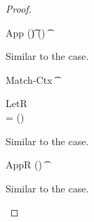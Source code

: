 \documentclass[acmsmall,screen,nonacm%
\Anonymous{,anonymous}{}%
\Final{}{,review}%
]{acmart}
\providecommand{\DIFaddbegin}{} %
\providecommand{\DIFaddend}{} %
\begin{document}
\begin{theorem}[Canonicalization]
\begin{proof}
\begin{proofcases}
\begin{proofcases}
		\begin{llproof}
\Hand 		  {}
		\end{llproof}
	  \end{proofcases}

      \proofcasederivation
	{App}
	{\semenv(\t) \in \semenv(\x)}
	{\semenv \th \capp \x \t}

      \begin{llproof}
	Similar to the  case.
      \end{llproof}


      \DIFaddbegin \proofcasederivation
        {Match-Ctx}
        {\Cshape \C \t \sh \\ \semenv \th \C\where{\cmatched \t \sh \cbrs}}
        {\semenv \th \C\where{\cmatch \t \cbrs}}


      \begin{llproof}
\Hand        {}
      \end{llproof}

      \DIFaddend \proofcasederivation
	{LetR}
        {\semenv\where{\x \is \gabsr} \th \cb \\
         \gabsr = \semenv(\cabsr \tv \tvs \ca) \\
         \gabsr \neq \emptyset
         }
        {\semenv \th \cletr \x \tv \tvs \ca \cb}

      \begin{llproof}
	Similar to the  case.
      \end{llproof}

      \proofcasederivation
	{AppR}
        {\greg {\semenv(\t)} \wild \in \semenv(\x)  }
        {\semenv \th \capp \x \t}

      \begin{llproof}
	Similar to the  case.
      \end{llproof}


\end{proofcases}
\end{proof}
\end{theorem}
\end{document}
